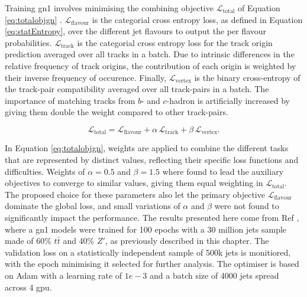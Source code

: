 Training \gls{gn1} involves minimising the combining objective $\mathcal{L}_{\textrm{total}}$ of Equation \ref{eq:totalobjgn} \cite{ATL-PHYS-PUB-2022-027}. $\mathcal{L}_{\textrm{flavour}}$ is the categorial cross entropy loss, as defined in Equation \ref{eq:statEntropy}, over the different jet flavours to output the per flavour probabilities. $\mathcal{L}_{\textrm{track}}$ is the categorial cross entropy loss for the track origin prediction averaged over all tracks in a batch. Due to intrinsic differences in the relative frequency of track origins, the contribution of each origin is weighted by their inverse frequency of occurence. Finally, $\mathcal{L}_{\textrm{vertex}}$ is the binary cross-entropy of the track-pair compatibility averaged over all track-pairs in a batch. The importance of matching tracks from $b$- and $c$-hadron is artificially increased by giving them double the weight compared to other track-pairs.

\begin{equation}\label{eq:totalobjgn}
  \mathcal{L}_{\textrm{total}} = \mathcal{L}_{\textrm{flavour}} + \alpha \, \mathcal{L}_{\textrm{track}} + \beta \, \mathcal{L}_{\textrm{vertex}}.
\end{equation}

In Equation \ref{eq:totalobjgn}, weights are applied to combine the different tasks that are represented by distinct values, reflecting their specific loss functions and difficulties. Weights of $\alpha = 0.5$ and $\beta = 1.5$ \cite{ATL-PHYS-PUB-2022-027} where found to lead the auxiliary objectives to converge to similar values, giving them equal weighting in $\mathcal{L}_{\textrm{total}}$. The proposed choice for these parameters also let the primary objective $\mathcal{L}_{\textrm{flavour}}$ dominate the global loss, and small variations of $\alpha$ and $\beta$ were not found to significantly impact the performance. The results presented here come from Ref \cite{ATL-PHYS-PUB-2022-027}, where a \gls{gn1} models were trained for 100 epochs with a 30 million jets sample made of 60\% $t\bar{t}$ and 40\% $Z'$, as previously described in this chapter. The validation loss on a statistically independent sample of 500k jets is monitiored, with the epoch minimising it selected for further analysis. The optimiser is based on Adam \cite{adamPaper} with a learning rate of $1e-3$ and a batch size of 4000 jets spread across 4 \gls{gpu}. \\

